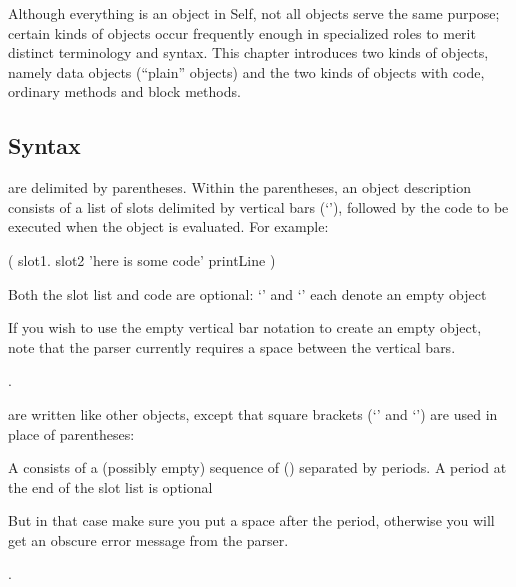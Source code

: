 \documentclass[letterpaper,10pt,english]{sphinxmanual}
\begin{document}
Although everything is an object in Self, not all objects serve the same purpose; certain kinds of
objects occur frequently enough in specialized roles to merit distinct terminology and syntax. This
chapter introduces two kinds of objects, namely data objects (“plain” objects) and the two kinds of
objects with code, ordinary methods and block methods.


\subsection{Syntax}
\label{\detokenize{langref:syntax}}\label{\detokenize{langref:index-3}}
 are delimited by parentheses. Within the parentheses, an object description consists
of a list of slots delimited by vertical bars (‘\sphinxcode{\textbar{}}’), followed by the code to be executed when the object
is evaluated. For example:

\begin{sphinxVerbatim}[commandchars=\\\{\}]
( \textbar{} slot1. slot2 \textbar{} ’here is some code’ printLine )
\end{sphinxVerbatim}

Both the slot list and code are optional: ‘\sphinxcode{(\textbar{} \textbar{})}’ and ‘\sphinxcode{()}’ each denote an empty object %
\begin{footnote}[1]\sphinxAtStartFootnote
If you wish to use the empty vertical bar notation to create an empty object, note that the parser currently requires a space between the vertical bars.
%
\end{footnote}.

 are written like other objects, except that square brackets (‘\sphinxcode{{[}}’ and ‘\sphinxcode{{]}}’) are used in
place of parentheses:

\begin{sphinxVerbatim}
\end{sphinxVerbatim}

A  consists of a (possibly empty) sequence of  ({\hyperref[\detokenize{langref:pp-langref-slot-descriptors}]{}}) separated by periods.
A period at the end of the slot list is optional %
\begin{footnote}[2]\sphinxAtStartFootnote
But in that case make sure you put a space after the period, otherwise you will get an obscure error message from the parser.
%
\end{footnote}.
\end{document}

